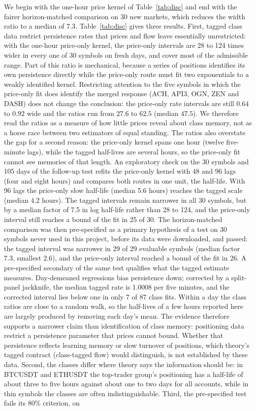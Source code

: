 \documentclass[12pt]{article}
\theoremstyle{definition}
\theoremstyle{remark}
\begin{document}
We begin with the one-hour price kernel of Table~\ref{tab:disc} and end with the fairer horizon-matched comparison on 30 new markets, which reduces the width ratio to a median of 7.3. Table~\ref{tab:disc} gives three results. First, tagged class data restrict persistence rates that prices and flow leave essentially unrestricted: with the one-hour price-only kernel, the price-only intervals are 28 to 124 times wider in every one of 30 symbols on fresh days, and cover most of the admissible range. Part of this ratio is mechanical, because a series of positions identifies its own persistence directly while the price-only route must fit two exponentials to a weakly identified kernel. Restricting attention to the five symbols in which the price-only fit does identify the merged response (ACH, API3, OGN, ZEN and DASH) does not change the conclusion: the price-only rate intervals are still $0.64$ to $0.92$ wide and the ratios run from $27.6$ to $62.5$ (median $47.5$). We therefore read the ratios as a measure of how little prices reveal about class memory, not as a horse race between two estimators of equal standing. The ratios also overstate the gap for a second reason: the price-only kernel spans one hour (twelve five-minute lags), while the tagged half-lives are several hours, so the price-only fit cannot see memories of that length. An exploratory check on the 30 symbols and 105 days of the follow-up test refits the price-only kernel with 48 and 96 lags (four and eight hours) and compares both routes in one unit, the half-life. With 96 lags the price-only slow half-life (median 5.6 hours) reaches the tagged scale (median 4.2 hours). The tagged intervals remain narrower in all 30 symbols, but by a median factor of 7.5 in log half-life rather than 28 to 124, and the price-only interval still reaches a bound of the fit in 25 of 30. The horizon-matched comparison was then pre-specified as a primary hypothesis of a test on 30 symbols never used in this project, before its data were downloaded, and passed: the tagged interval was narrower in 29 of 29 evaluable symbols (median factor 7.3, smallest 2.6), and the price-only interval reached a bound of the fit in 26. A pre-specified secondary of the same test qualifies what the tagged estimate measures. Day-demeaned regressions bias persistence down; corrected by a split-panel jackknife, the median tagged rate is 1.0008 per five minutes, and the corrected interval lies below one in only 7 of 87 class fits. Within a day the class ratios are close to a random walk, so the half-lives of a few hours reported here are largely produced by removing each day's mean. The evidence therefore supports a narrower claim than identification of class memory: positioning data restrict a persistence parameter that prices cannot bound. Whether that persistence reflects learning memory or slow turnover of positions, which theory's tagged contract (class-tagged flow) would distinguish, is not established by these data. Second, the classes differ where theory says the information should be: in BTCUSDT and ETHUSDT the top-trader group's positioning has a half-life of about three to five hours against about one to two days for all accounts, while in thin symbols the classes are often indistinguishable. Third, the pre-specified test fails its 80\% criterion, on 
\end{document}
